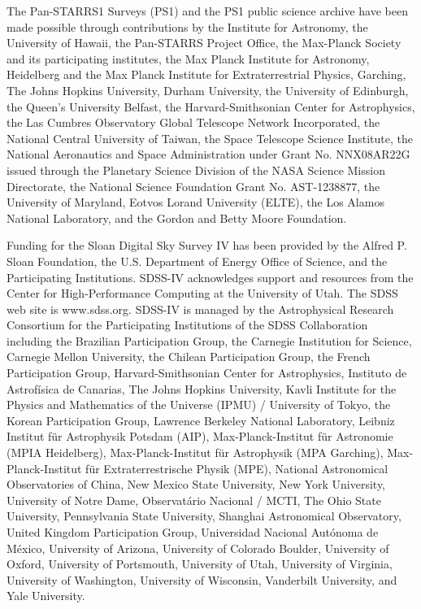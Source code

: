 \documentclass[twocolumn]{aastex62}
\begin{document}
The Pan-STARRS1 Surveys (PS1) and the PS1 public science archive have been made possible through contributions by the Institute for Astronomy, the University of Hawaii, the Pan-STARRS Project Office, the Max-Planck Society and its participating institutes, the Max Planck Institute for Astronomy, Heidelberg and the Max Planck Institute for Extraterrestrial Physics, Garching, The Johns Hopkins University, Durham University, the University of Edinburgh, the Queen's University Belfast, the Harvard-Smithsonian Center for Astrophysics, the Las Cumbres Observatory Global Telescope Network Incorporated, the National Central University of Taiwan, the Space Telescope Science Institute, the National Aeronautics and Space Administration under Grant No. NNX08AR22G issued through the Planetary Science Division of the NASA Science Mission Directorate, the National Science Foundation Grant No. AST-1238877, the University of Maryland, Eotvos Lorand University (ELTE), the Los Alamos National Laboratory, and the Gordon and Betty Moore Foundation.

Funding for the Sloan Digital Sky Survey IV has been provided by the Alfred P. Sloan Foundation, the U.S. Department of Energy Office of Science, and the Participating Institutions. SDSS-IV acknowledges
support and resources from the Center for High-Performance Computing at
the University of Utah. The SDSS web site is www.sdss.org.
SDSS-IV is managed by the Astrophysical Research Consortium for the 
Participating Institutions of the SDSS Collaboration including the 
Brazilian Participation Group, the Carnegie Institution for Science, 
Carnegie Mellon University, the Chilean Participation Group, the French Participation Group, Harvard-Smithsonian Center for Astrophysics, 
Instituto de Astrof\'isica de Canarias, The Johns Hopkins University, Kavli Institute for the Physics and Mathematics of the Universe (IPMU) / 
University of Tokyo, the Korean Participation Group, Lawrence Berkeley National Laboratory, 
Leibniz Institut f\"ur Astrophysik Potsdam (AIP),  
Max-Planck-Institut f\"ur Astronomie (MPIA Heidelberg), 
Max-Planck-Institut f\"ur Astrophysik (MPA Garching), 
Max-Planck-Institut f\"ur Extraterrestrische Physik (MPE), 
National Astronomical Observatories of China, New Mexico State University, 
New York University, University of Notre Dame, 
Observat\'ario Nacional / MCTI, The Ohio State University, 
Pennsylvania State University, Shanghai Astronomical Observatory, 
United Kingdom Participation Group,
Universidad Nacional Aut\'onoma de M\'exico, University of Arizona, 
University of Colorado Boulder, University of Oxford, University of Portsmouth, 
University of Utah, University of Virginia, University of Washington, University of Wisconsin, 
Vanderbilt University, and Yale University.
\end{document}
